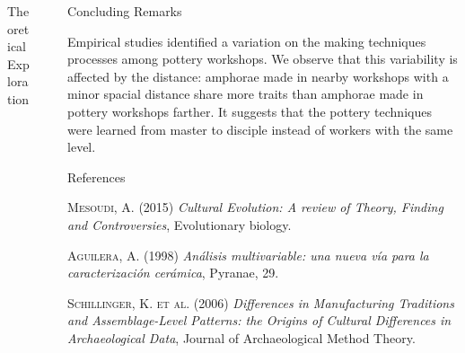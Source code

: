 \documentclass[final]{beamer}
\newlength{\sepwid}
\newlength{\onecolwid}
\newlength{\twocolwid}
\begin{document}
\begin{frame}[t]
\begin{columns}[t]
\begin{column}{\twocolwid}
\begin{block}{Theoretical Exploration}
\begin{columns}[t,totalwidth=\twocolwid]
\begin{column}{\onecolwid}
\end{column}

\begin{column}{\sepwid}\end{column} %

\begin{column}{\onecolwid} %
on the right
\end{column}
\end{columns}

\end{block}
\end{column}


\begin{column}{\sepwid}\end{column} %

\begin{column}{\onecolwid} %

\begin{block}{Concluding Remarks}

Empirical studies identified a variation on the making techniques processes among pottery workshops. We observe that this variability is affected by the distance: amphorae made in nearby workshops with a minor spacial distance share more traits than amphorae made in pottery workshops farther. It suggests that the pottery techniques were learned from master to disciple instead of workers with the same level. 
 
\end{block}

\begin{block}{References}
\small

\begin{thebibliography}{50}

\textsc{Mesoudi, A. (2015)}
\textit{Cultural Evolution: A review of Theory, Finding and Controversies}, Evolutionary biology.

\textsc{Aguilera, A. (1998)}
\textit{An\'alisis multivariable: una nueva v\'ia para la caracterizaci\'on cer\'amica}, Pyranae, 29.

\textsc{Schillinger, K. et al. (2006)}
\textit{Differences in Manufacturing Traditions and Assemblage-Level Patterns: the Origins of Cultural Differences in Archaeological Data}, Journal of Archaeological Method Theory.


\end{thebibliography}
\end{block}
\end{column}
\end{columns}
\end{frame}
\end{document}
